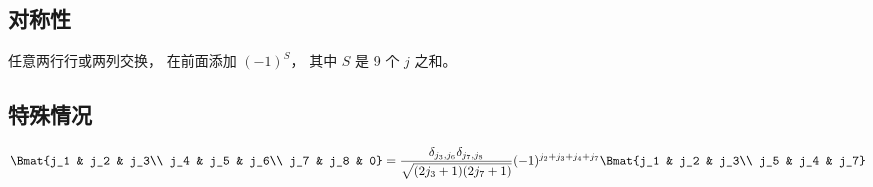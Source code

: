 
\subsection{对称性}
任意两行行或两列交换， 在前面添加 $(-1)^S$， 其中 $S$ 是 9 个 $j$ 之和。

\subsection{特殊情况}
\begin{equation}
\Bmat{j_1 & j_2 & j_3\\ j_4 & j_5 & j_6\\ j_7 & j_8 & 0} =
\frac{\delta_{j_3, j_6}\delta_{j_7, j_8}}{\sqrt{(2j_3+1)(2j_7+1)}} (-1)^{j_2+j_3+j_4+j_7} \Bmat{j_1 & j_2 & j_3\\ j_5 & j_4 & j_7}
\end{equation}
